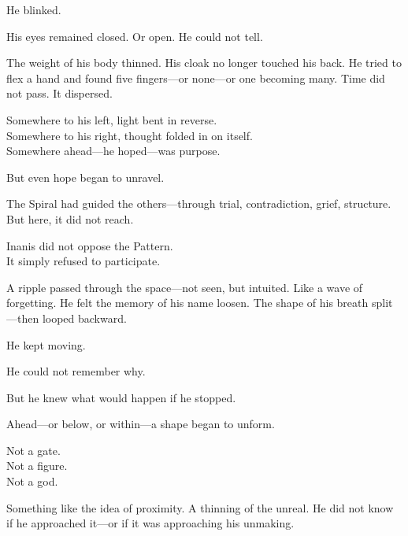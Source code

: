 \documentclass[12pt]{article}
\begin{document}
\vspace{0.5em}
He blinked.

\vspace{0.5em}
His eyes remained closed. Or open. He could not tell.

\vspace{0.5em}
The weight of his body thinned. His cloak no longer touched his back. He tried to flex a hand and found five fingers---or none---or one becoming many. Time did not pass. It dispersed.

\vspace{0.5em}
Somewhere to his left, light bent in reverse.\\
Somewhere to his right, thought folded in on itself.\\
Somewhere ahead---he hoped---was purpose.

\vspace{0.5em}
But even hope began to unravel.

\vspace{0.5em}
The Spiral had guided the others---through trial, contradiction, grief, structure.\\
But here, it did not reach.

\vspace{0.5em}
Inanis did not oppose the Pattern.\\
It simply refused to participate.

\vspace{0.5em}
A ripple passed through the space---not seen, but intuited. Like a wave of forgetting. He felt the memory of his name loosen. The shape of his breath split---then looped backward.

\vspace{0.5em}
He kept moving.

\vspace{0.5em}
He could not remember why.

\vspace{0.5em}
But he knew what would happen if he stopped.

\vspace{0.5em}
Ahead---or below, or within---a shape began to unform.

\vspace{0.5em}
Not a gate.\\
Not a figure.\\
Not a god.

\vspace{0.5em}
Something like the idea of proximity. A thinning of the unreal. He did not know if he approached it---or if it was approaching his unmaking.
\end{document}
